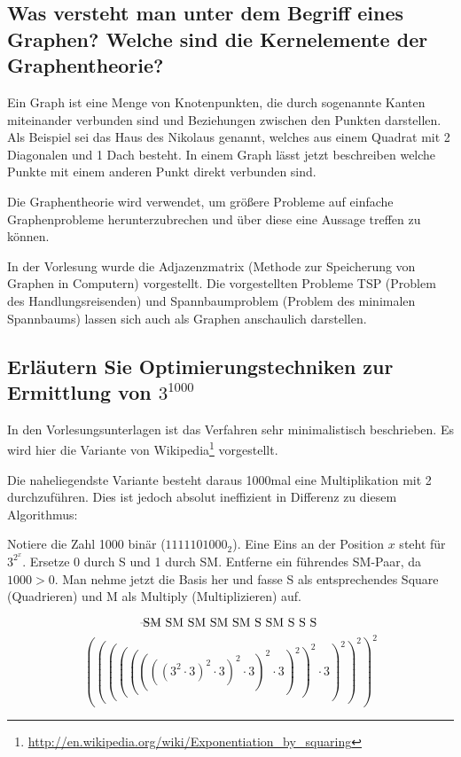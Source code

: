 \subsection{Was versteht man unter dem Begriff eines Graphen?
    Welche sind die Kernelemente der Graphentheorie?}

Ein Graph ist eine Menge von Knotenpunkten, die durch sogenannte Kanten
miteinander verbunden sind und Beziehungen zwischen den Punkten darstellen.
Als Beispiel sei das Haus des Nikolaus genannt, welches aus einem Quadrat
mit 2 Diagonalen und 1 Dach besteht. In einem Graph lässt jetzt beschreiben
welche Punkte mit einem anderen Punkt direkt verbunden sind.

Die Graphentheorie wird verwendet, um größere Probleme auf einfache
Graphenprobleme herunterzubrechen und über diese eine Aussage treffen
zu können.

In der Vorlesung wurde die Adjazenzmatrix (Methode zur Speicherung
von Graphen in Computern) vorgestellt. Die vorgestellten
Probleme TSP (Problem des Handlungsreisenden) und Spannbaumproblem
(Problem des minimalen Spannbaums) lassen sich auch als Graphen anschaulich
darstellen.

\subsection{Erläutern Sie Optimierungstechniken zur Ermittlung von $3^{1000}$}

 In den Vorlesungsunterlagen ist das Verfahren sehr
    minimalistisch beschrieben. Es wird hier die Variante von
    Wikipedia\footnote{
    \url{http://en.wikipedia.org/wiki/Exponentiation_by_squaring}}
    vorgestellt.

Die naheliegendste Variante besteht daraus 1000mal eine Multiplikation
mit 2 durchzuführen. Dies ist jedoch absolut ineffizient in Differenz
zu diesem Algorithmus:

Notiere die Zahl 1000 binär ($1111101000_2$). Eine Eins an der Position
$x$ steht für $3^{2^x}$. Ersetze 0 durch S und 1 durch SM. Entferne
ein führendes SM-Paar, da $1000 > 0$. Man nehme jetzt die Basis her und
fasse S als entsprechendes Square (Quadrieren) und M als Multiply
(Multiplizieren) auf.

\[
    \text{SM\hspace{-17pt}{\textemdash}{--}\hspace{2pt}
        SM SM SM SM S SM S S S}
\] \[
    ((((((((3^2 \cdot 3)^2 \cdot 3)^2 \cdot 3)^2
        \cdot 3)^2)^2 \cdot 3)^2)^2)^2
\]

